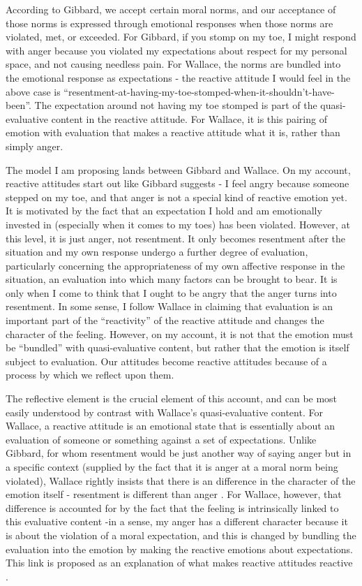 \documentclass[phd,12pt,oneside,paper=letterpaper]{ubcthesis}
\begin{document}
According to Gibbard, we accept certain moral norms, and our acceptance of those norms is expressed through emotional responses when those norms are violated, met, or exceeded. For Gibbard, if you stomp on my toe, I might respond with anger because you violated my expectations about respect for my personal space, and not causing needless pain.  For Wallace, the norms are bundled into the emotional response as expectations - the reactive attitude I would feel in the above case is ``resentment-at-having-my-toe-stomped-when-it-shouldn't-have-been''. The expectation around not having my toe stomped is part of the quasi-evaluative content in the reactive attitude. For Wallace, it is this pairing of emotion with evaluation that makes a reactive attitude what it is, rather than simply anger. 

The model I am proposing lands between Gibbard and Wallace. On my account, reactive attitudes start out like Gibbard suggests - I feel angry because someone stepped on my toe, and that anger is not a special kind of reactive emotion yet. It is motivated by the fact that an expectation I hold and am emotionally invested in (especially when it comes to my toes) has been violated. However, at this level, it is just anger, not resentment. It only becomes resentment after the situation and my own response undergo a further degree of evaluation, particularly concerning the appropriateness of my own affective response in the situation, an evaluation into which many factors can be brought to bear. It is only when I come to think that I ought to be angry that the anger turns into resentment. In some sense, I follow Wallace in claiming that evaluation is an important part of the ``reactivity'' of the reactive attitude and changes the character of the feeling. However, on my account, it is not that the emotion must be ``bundled'' with quasi-evaluative content, but rather that the emotion is itself subject to evaluation. Our attitudes become reactive attitudes because of a process by which we reflect upon them. 

The reflective element is the crucial element of this account, and can be most easily understood by contrast with Wallace's quasi-evaluative content. For Wallace, a reactive attitude is an emotional state that is essentially about an evaluation of someone or something against a set of expectations. Unlike Gibbard, for whom resentment would be just another way of saying anger but in a specific context (supplied by the fact that it is anger at a moral norm being violated), Wallace rightly insists that there is an difference in the character of the emotion itself - resentment is different than anger \citep[p.49]{wallace1994}. For Wallace, however, that difference is accounted for by the fact that the feeling is intrinsically linked to this evaluative content -in a sense, my anger has a different character because it is about the violation of a moral expectation, and this is changed by bundling the evaluation into the emotion by making the reactive emotions about expectations. This link is proposed as an explanation of what makes reactive attitudes reactive \citep[p.24]{wallace1994}. 
\end{document}
